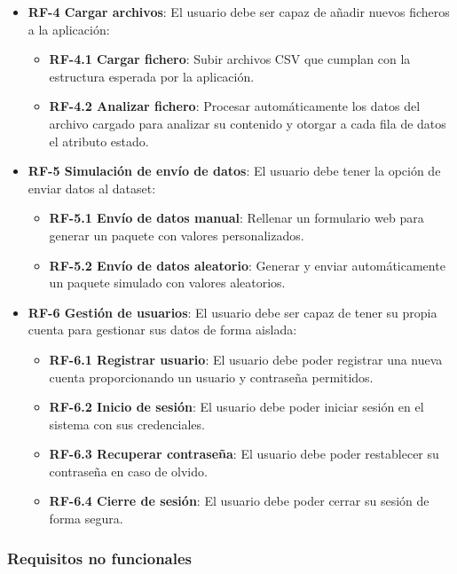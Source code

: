 \begin{itemize}
    \item \textbf{RF-4 Cargar archivos}: El usuario debe ser capaz de añadir nuevos ficheros a la aplicación:
    \begin{itemize}
        \item \textbf{RF-4.1 Cargar fichero}: Subir archivos CSV que cumplan con la estructura esperada por la aplicación.
        \item \textbf{RF-4.2 Analizar fichero}: Procesar automáticamente los datos del archivo cargado para analizar su contenido y otorgar a cada fila de datos el atributo estado.
    \end{itemize}

    \item \textbf{RF-5 Simulación de envío de datos}: El usuario debe tener la opción de enviar datos al dataset:
    \begin{itemize}
        \item \textbf{RF-5.1 Envío de datos manual}: Rellenar un formulario web para generar un paquete con valores personalizados.
        \item \textbf{RF-5.2 Envío de datos aleatorio}: Generar y enviar automáticamente un paquete simulado con valores aleatorios.
    \end{itemize}

    \item \textbf{RF-6 Gestión de usuarios}: El usuario debe ser capaz de tener su propia cuenta para gestionar sus datos de forma aislada:
    \begin{itemize}
        \item \textbf{RF-6.1 Registrar usuario}: El usuario debe  poder registrar una nueva cuenta proporcionando un usuario y contraseña permitidos.
        \item \textbf{RF-6.2 Inicio de sesión}: El usuario debe poder iniciar sesión en el sistema con sus credenciales.
        \item \textbf{RF-6.3 Recuperar contraseña}: El usuario debe poder restablecer su contraseña en caso de olvido.
        \item \textbf{RF-6.4 Cierre de sesión}: El usuario debe poder cerrar su sesión de forma segura.
    \end{itemize}
 
\end{itemize}




\subsubsection{Requisitos no funcionales}

